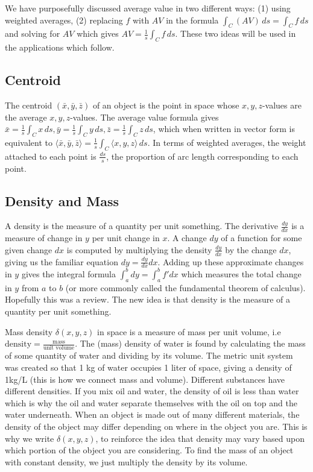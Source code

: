 \bigskip

We have purposefully discussed average value in two different ways:
(1) using weighted averages, (2) replacing $f$ with $AV$ in the
formula $\int_C (AV) \,ds = \int_C f \,ds$ and solving for $AV$ which gives
$AV=\frac{1}{s}\int_C f \,ds$.  These two ideas will be used in the
applications which follow. 

\subsection{Centroid}
The centroid $(\bar x,\bar y,\bar z)$ of an object is the point in
space whose {$x,y,z$}-values are the average {$x,y,z$}-values.  The
average value formula gives $\bar x = \frac{1}{s}\int_C x\,ds, \bar y =
\frac{1}{s}\int_C y\,ds, \bar z = \frac{1}{s}\int_C z\,ds$, which when written
in vector form is equivalent to $ \langle\bar x,\bar y,\bar z\rangle =
\frac{1}{s}\int_C  \langle x,y,z\rangle \,ds$. In terms of weighted averages,
the weight attached to each point is $\frac{ds}{s}$, the proportion of
arc length corresponding to each point.

\subsection{Density and Mass}

A density is the measure of a quantity per unit something. The
derivative $\frac{dy}{dx}$ is a measure of change in $y$ per unit
change in $x$. A change $dy$ of a function for some given change $dx$
is computed by multiplying the density $\frac{dy}{dx}$ by the change
$dx$, giving us the familiar equation $dy = \frac{dy}{dx}dx$. Adding
up these approximate changes in $y$ gives the integral formula $\int_a^b
dy = \int_a^b f' dx$ which measures the total change in $y$ from $a$ to
$b$ (or more commonly called the fundamental theorem of calculus). 
Hopefully this was a review. The new idea is that density is the
measure of a quantity per unit something.

Mass density $\delta(x,y,z)$ in space is a measure of mass per unit volume,
i.e $\text{density}=\frac{\text{mass}}{\text{unit volume}}$. The
(mass) density of water is found by calculating the mass of some
quantity of water and dividing by its volume. The metric unit system
was created so that 1 kg of water occupies 1 liter of space, giving a
density of 1kg/L (this is how we connect mass and volume). Different
substances have different densities.  If you mix oil and water, the
density of oil is less than water which is why the oil and water
separate themselves with the oil on top and the water underneath.
When an object is made out of many different materials, the density of
the object may differ depending on where in the object you are.  This
is why we write $\delta(x,y,z)$, to reinforce the idea that density may
vary based upon which portion of the object you are considering.  To
find the mass of an object with constant density, we just multiply the
density by its volume.

